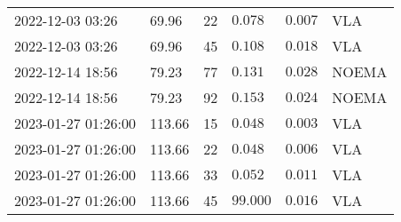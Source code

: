 \documentclass{nature_plusfigure}
\begin{document}
\begin{supplement}
\begin{center}
\begin{longtable}{llllll}
2022-12-03 03:26 & 69.96 & 22 & $0.078$ & $0.007$ & VLA \\ 
2022-12-03 03:26 & 69.96 & 45 & $0.108$ & $0.018$ & VLA \\ 
2022-12-14 18:56 & 79.23 & 77 & $0.131$ & $0.028$ & NOEMA \\ 
2022-12-14 18:56 & 79.23 & 92 & $0.153$ & $0.024$ & NOEMA \\ 
2023-01-27 01:26:00 & 113.66 & 15 & $0.048$ & $0.003$ & VLA \\ 
2023-01-27 01:26:00 & 113.66 & 22 & $0.048$ & $0.006$ & VLA \\ 
2023-01-27 01:26:00 & 113.66 & 33 & $0.052$ & $0.011$ & VLA \\ 
2023-01-27 01:26:00 & 113.66 & 45 & $99.000$ & $0.016$ & VLA \\ 
\hline 
\end{longtable} 
\end{center} 


\end{supplement}

\end{document}
